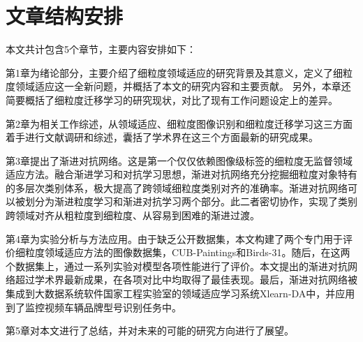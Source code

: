 \section{文章结构安排}
本文共计包含5个章节，主要内容安排如下：

第1章为绪论部分，主要介绍了细粒度领域适应的研究背景及其意义，定义了细粒度领域适应这一全新问题，并概括了本文的研究内容和主要贡献。
另外，本章还简要概括了细粒度迁移学习的研究现状，对比了现有工作问题设定上的差异。

第2章为相关工作综述，从领域适应、细粒度图像识别和细粒度迁移学习这三方面着手进行文献调研和综述，囊括了学术界在这三个方面最新的研究成果。

第3章提出了渐进对抗网络。这是第一个仅仅依赖图像级标签的细粒度无监督领域适应方法。融合渐进学习和对抗学习思想，渐进对抗网络充分挖掘细粒度对象特有的多层次类别体系，极大提高了跨领域细粒度类别对齐的准确率。渐进对抗网络可以被划分为渐进粒度学习和渐进对抗学习两个部分。此二者密切协作，实现了类别跨领域对齐从粗粒度到细粒度、从容易到困难的渐进过渡。

第4章为实验分析与方法应用。由于缺乏公开数据集，本文构建了两个专门用于评价细粒度领域适应方法的图像数据集，CUB-Paintings和Birds-31。随后，在这两个数据集上，通过一系列实验对模型各项性能进行了评价。本文提出的渐进对抗网络超过学术界最新成果，在各项对比中均取得了最佳表现。最后，渐进对抗网络被集成到大数据系统软件国家工程实验室的领域适应学习系统Xlearn-DA中，并应用到了监控视频车辆品牌型号识别任务中。

第5章对本文进行了总结，并对未来的可能的研究方向进行了展望。





